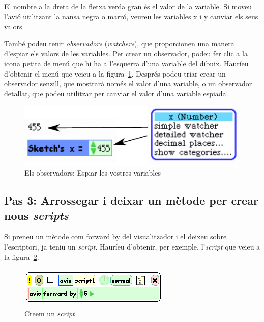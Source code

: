 El nombre a la dreta de la fletxa verda gran és el valor de la variable. Si moveu l'avió utilitzant la nansa negra o marró, veureu les variables \textsf{x} i \textsf{y} canviar els seus valors.

També podeu tenir \emph{observadors} (\emph{watchers}), que proporcionen una manera d'espiar els valors de les variables. Per crear un observador, podeu fer clic a la icona petita de menú que hi ha a l'esquerra d'una variable del dibuix. Hauríeu d'obtenir el menú que veieu a la figura~\ref{fig2407}. Després podeu triar crear un observador senzill, que mostrarà només el valor d'una variable, o un observador detallat, que podeu utilitzar per canviar el valor d'una variable espiada. 
\begin{figure}[h!]
\begin{center}
\includegraphics[scale=1]{Imatges/figura24-7}
\end{center}
\caption{Els observadors: Espiar les vostres variables}
\label{fig2407}
\end{figure}

\subsection{Pas 3: Arrossegar i deixar un mètode per crear nous \emph{scripts}}
Si preneu un mètode com \textsf{forward by} del visualitzador i el deixeu sobre l'escriptori, ja teniu un \emph{script}. Hauríeu d'obtenir, per exemple, l'\emph{script} que veieu a la figura~\ref{fig2408}.
\newpage
\begin{figure}[h!]
\begin{center}
\includegraphics[scale=0.8]{Imatges/figura24-8}
\end{center}
\caption{Creem un \emph{script}}
\label{fig2408}
\end{figure}

